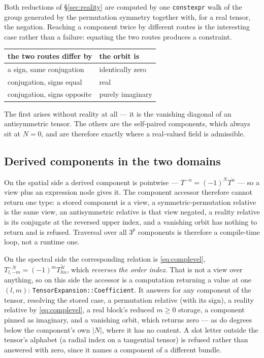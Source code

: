 \documentclass[11pt,a4paper]{article}
\newcommand{\conj}[1]{\overline{#1}}
\newcommand{\code}[1]{\texttt{#1}}
\begin{document}
Both reductions of \S\ref{sec:reality} are computed by one \code{constexpr}
walk of the group generated by the permutation symmetry together with, for
a real tensor, the negation.  Reaching a component twice by different
routes is the interesting case rather than a failure: equating the two
routes produces a constraint.
\begin{center}
\begin{tabular}{ll}
  \toprule
  the two routes differ by & the orbit is \\
  \midrule
  a sign, same conjugation & identically zero \\
  conjugation, signs equal & real \\
  conjugation, signs opposite & purely imaginary \\
  \bottomrule
\end{tabular}
\end{center}
The first arises without reality at all --- it is the vanishing diagonal
of an antisymmetric tensor.  The others are the self-paired components,
which always sit at $N=0$, and are therefore exactly where a real-valued
field is admissible.

\subsection{Derived components in the two domains}
\label{sec:domains}

On the spatial side a derived component is pointwise --- $T^{-\alpha} =
(-1)^N\conj{T^{\alpha}}$ --- so a view plus an expression node gives it.
The component accessor therefore cannot return one type: a stored
component is a view, a symmetric-permutation relative is the same view, an
antisymmetric relative is that view negated, a reality relative is its
conjugate at the reversed upper index, and a vanishing orbit has nothing
to return and is refused.  Traversal over all $3^p$ components is
therefore a compile-time loop, not a runtime one.

On the spectral side the corresponding relation is \eqref{eq:complevel},
$T^{-N}_{l,-m} = (-1)^m \conj{T^{N}_{lm}}$, which \emph{reverses the order
index}.  That is not a view over anything, so on this side the
accessor is a computation returning a value at one $(l,m)$:
\code{TensorExpansion::Coefficient}.  It answers for any component of the tensor, resolving the
stored case, a permutation relative (with its sign), a reality relative
by \eqref{eq:complevel}, a real block's reduced $m\geq 0$ storage, a
component pinned as imaginary, and a vanishing orbit, which returns zero
--- as do degrees below the component's own $|N|$, where it has no
content.  A slot letter outside the tensor's alphabet (a radial index on a
tangential tensor) is refused rather than answered with zero, since it
names a component of a different bundle.
\end{document}
